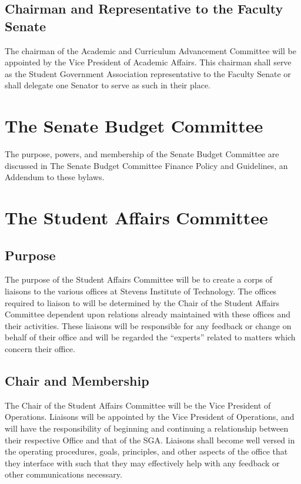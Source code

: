 \documentclass[12pt]{scrreprt}
\begin{document}
\subsection{Chairman and Representative to the Faculty Senate}
The chairman of the Academic and Curriculum Advancement Committee will be
appointed by the Vice President of Academic Affairs. This chairman shall serve as the
Student Government Association representative to the Faculty Senate or shall delegate
one Senator to serve as such in their place.

\section{The Senate Budget Committee}
The purpose, powers, and membership of the Senate Budget Committee are discussed in The Senate Budget Committee Finance Policy and Guidelines, an Addendum to these bylaws.

\section{The Student Affairs Committee}

\subsection{Purpose}
The purpose of the Student Affairs Committee will be to create a corps of liaisons to the
various offices at Stevens Institute of Technology. The offices required to liaison to will be
determined by the Chair of the Student Affairs Committee dependent upon relations already
maintained with these offices and their activities. These liaisons will be responsible for any
feedback or change on behalf of their office and will be regarded the “experts” related to
matters which concern their office.

\subsection{Chair and Membership}
The Chair of the Student Affairs Committee will be the Vice President of Operations.
Liaisons will be appointed by the Vice President of Operations, and will have the responsibility of beginning and continuing a relationship between their respective Office and that of the SGA. Liaisons shall become well versed in the operating procedures, goals, principles, and other aspects of the office that they interface with such that they may effectively help with any feedback or other communications necessary.
\end{document}
